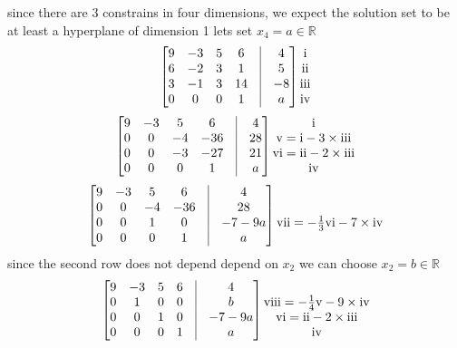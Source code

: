 \documentclass[a4paper,10pt]{article}
\newcommand{\RN}[1]{%
  \textup{\uppercase\expandafter{\romannumeral#1}}%
}
\begin{document}
since there are 3 constrains in four dimensions, we expect the solution set to be at least a hyperplane of dimension 1
lets set $x_4=a \in \mathbb{R}$
\[
\begin{bmatrix}
  9 & -3 & 5 & 6  &\vline  & 4 \\
  6 & -2 & 3 & 1  &\vline  & 5 \\
  3 & -1 & 3 & 14 &\vline  & -8\\
  0 &  0 & 0 & 1  &\vline  & a
\end{bmatrix}
\begin{matrix}
 \RN{1}\\ \RN{2}\\ \RN{3}\\ \RN{4}\\
\end{matrix}
\]
\[\begin{bmatrix}
  9 & -3 & 5 & 6  &\vline  & 4 \\
  0 & 0 & -4 & -36  &\vline  & 28\\
  0 & 0 & -3 & -27 &\vline  & 21\\
  0 &  0 & 0 & 1  &\vline  & a
\end{bmatrix}
\begin{matrix}
 \RN{1}\\ \RN{5}= \RN{1}-3\times \RN{3}\\ \RN{6}=\RN{2}-2\times \RN{3}\\ \RN{4}\\
\end{matrix}
\]
\[\begin{bmatrix}
  9 & -3 & 5 & 6  &\vline  & 4   \\
  0 & 0 & -4 & -36  &\vline  & 28\\
  0 & 0 & 1 & 0 &\vline  & -7-9a \\
  0 &  0 & 0 & 1  &\vline  & a
\end{bmatrix}
\begin{matrix}
 \\ \\ \RN{7}=-\frac{1}{3} \RN{6}-7\times \RN{4} \\ \\
\end{matrix}
\]
since the second row does not depend depend on $x_2$ we can choose $x_2= b \in \mathbb{R} $
\[\begin{bmatrix}
  9 & -3 & 5 & 6  &  \vline  & 4   \\
  0 & 1 & 0 & 0  &   \vline  & b\\
  0 & 0 & 1 & 0 &    \vline  & -7-9a  \\
  0 &  0 & 0 & 1  &   \vline  & a
\end{bmatrix}
\begin{matrix}
 \\ \RN{8}=-\frac{1}{4} \RN{5}-9\times \RN{4}\\ \RN{6}=\RN{2}-2\times \RN{3}\\ \RN{4}\\
\end{matrix}
\]
\end{document}
